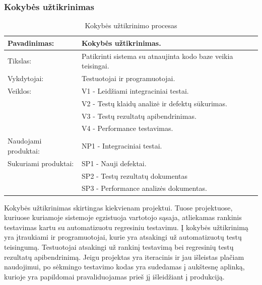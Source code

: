 \documentclass{VUMIFPSkursinis}
\begin{document}
	\subsubsection{Kokybės užtikrinimas}
	\begin{center}
		\begin{table}[ht]
		\caption{Kokybės užtikrinimo procesas}
		\begin{tabular}{ | l | l | } 
		\hline
		Pavadinimas:         & Kokybės užtikrinimas.                                       \\ \hline
		Tikslas: 	           & Patikrinti sistema su atnaujinta kodo baze veikia teisingai. \\ \hline
		Vykdytojai:          & Testuotojai ir programuotojai.                                \\ \hline
		Veiklos:             & V1 - Leidžiami integraciniai testai. 													\\
						             & V2 - Testų klaidų analizė ir defektų sūkurimas. 								 \\
					 	             & V3 - Testų rezultatų apibendrinimas. 														\\ 
						    				 & V4 - Performance testavimas. 																		 \\ \hline
		Naudojami produktai: & NP1 - Integraciniai testai. 																				\\ \hline
		Sukuriami produktai: & SP1 - Nauji defektai. 																								\\
												 & SP2 - Testų rezultatų dokumentas 																	   \\
												 & SP3 - Performance analizės dokumentas. 														   	\\ \hline
		\end{tabular}
	\end{table}
		\end{center}
	Kokybės užtikrinimas skirtingas kiekvienam projektui. Tuose projektuose, kuriuose kuriamoje sistemoje egzistuoja vartotojo sąsaja, atliekamas rankinis testavimas kartu su automatizuotu regresiniu testavimu. Į kokybės užtikrinimą yra įtraukiami ir programuotojai, kurie yra atsakingi už automatizuotų testų teisingumą. Testuotojai atsakingi už rankinį testavimą bei regresinių testų rezultatų apibendrinimą. Jeigu projektas yra iteracinis ir jau išleistas plačiam naudojimui, po sėkmingo testavimo kodas yra sudedamas į aukštesnę aplinką, kurioje yra papildomai pravaliduojamas prieš jį išleidžiant į produkciją.
\end{document}
